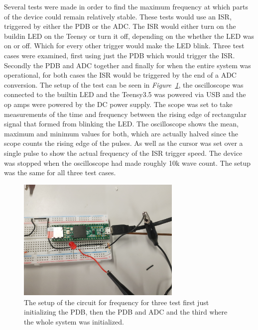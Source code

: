 Several tests were made in order to find the maximum frequency at which parts of the device could remain relatively stable.
These tests would use an ISR, triggered by either the PDB or the ADC.
The ISR would either turn on the buildin LED on the Teensy or turn it off, depending on the whether the LED was on or off.
Which for every other trigger would make the LED blink.
Three test cases were examined, first using just the PDB which would trigger the ISR. 
Secondly the PDB and ADC together and finally for when the entire system was operational, for both cases the ISR would be triggered by the end of a ADC conversion.
The setup of the test can be seen in \textit{Figure~\ref{fig:SetupCircSpeed}}, the oscilloscope was connected to the builtin LED and the Teensy3.5 was powered via USB and the op amps were powered by the DC power supply.
The scope was set to take measurements of the time and frequency between the rising edge of rectangular signal that formed from blinking the LED. 
The oscilloscope shows the mean, maximum and minimum values for both, which are actually halved since the scope counts the rising edge of the pulses.
As well as the cursor was set over a single pulse to show the actual frequency of the ISR trigger speed.
The device was stopped when the oscilloscope had made roughly 10k wave count.
The setup was the same for all three test cases.


\begin{figure}[h]
    \centering
    \includegraphics[width=0.7\textwidth]{graphics/SetupCircSpeed.jpg}
    \caption{The setup of the circuit for frequency for three test first just initializing the PDB, then the PDB and ADC and the third where the whole system was initialized.}
    \label{fig:SetupCircSpeed}
\end{figure}

